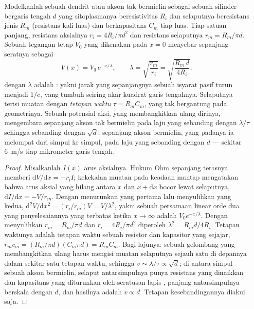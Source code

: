 \begin{theorem}\label{thm:b3:nervous-systems:cable}
%
Modelkanlah sebuah dendrit atau akson tak bermielin sebagai sebuah silinder
bergaris tengah $d$ yang sitoplasmanya beresistivitas $R_{i}$ dan selaputnya
beresistans jenis $R_{m}$ (resistans kali luas) dan berkapasitans $C_{m}$ tiap
luas. Tiap satuan panjang, resistans aksialnya $r_{i} = 4R_{i}/\pi d^{2}$
dan resistans selaputnya $r_{m} = R_{m}/\pi d$. Sebuah tegangan tetap
$V_{0}$ yang dikenakan pada $x = 0$ menyebar sepanjang seratnya sebagai
\[
V(x) = V_{0}\,e^{-x/\lambda}, \qquad
\lambda = \sqrt{\frac{r_{m}}{r_{i}}} = \sqrt{\frac{R_{m}\,d}{4R_{i}}},
\]
dengan $\lambda$ adalah \emph{}: yakni jarak yang sepanjangnya
sebuah isyarat pasif turun menjadi $1/e$, yang tumbuh seiring akar kuadrat
garis tengahnya. Selaputnya terisi muatan dengan \emph{tetapan waktu} $\tau =
R_{m}C_{m}$, yang tak bergantung pada geometrinya. Sebuah potensial aksi, yang
membangkitkan ulang dirinya, mengembara sepanjang akson tak bermielin pada laju
yang sebanding dengan $\lambda/\tau$ sehingga sebanding dengan $\sqrt{d}$;
sepanjang akson bermielin, yang padanya ia melompat dari simpul ke simpul, pada
laju yang sebanding dengan $d$ --- sekitar \qty{6}{m/s} tiap mikrometer garis tengah.
\end{theorem}
\begin{proof}
Misalkanlah $I(x)$ arus aksialnya. Hukum Ohm sepanjang terasnya memberi
$\mathrm{d}V/\mathrm{d}x = -r_{i}I$; kekekalan muatan pada keadaan
mantap mengatakan bahwa arus aksial yang hilang antara $x$ dan $x + \mathrm{d}x$
bocor lewat selaputnya, $\mathrm{d}I/\mathrm{d}x = -V/r_{m}$.
Dengan menurunkan yang pertama lalu menyulihkan yang kedua,
$\mathrm{d}^{2}V/\mathrm{d}x^{2} = (r_{i}/r_{m})V = V/\lambda^{2}$, yakni sebuah
persamaan linear orde dua yang penyelesaiannya yang terbatas ketika $x \to \infty$ adalah
$V_{0}e^{-x/\lambda}$. Dengan menyulihkan $r_{m} = R_{m}/\pi d$ dan $r_{i} =
4R_{i}/\pi d^{2}$ diperoleh $\lambda^{2} = R_{m}d/4R_{i}$. Tetapan waktunya
adalah tetapan waktu sebuah resistor dan kapasitor yang sejajar, $r_{m}c_{m} =
(R_{m}/\pi d)(C_{m}\pi d) = R_{m}C_{m}$. Bagi lajunya: sebuah gelombang yang
membangkitkan ulang harus mengisi muatan selaputnya sejauh satu  di
depannya dalam sekitar satu tetapan waktu, sehingga $v \sim \lambda/\tau \propto \sqrt{d}$;
di antara simpul sebuah akson bermielin, selaput antarsimpulnya punya
resistans yang dinaikkan dan kapasitans yang diturunkan oleh seratusan lapis
, panjang antarsimpulnya berskala dengan $d$, dan hasilnya adalah
$v \propto d$. Tetapan kesebandingannya diakui saja.
\end{proof}

